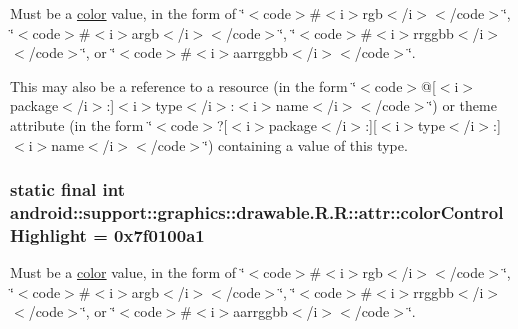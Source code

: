 Must be a \hyperlink{classandroid_1_1support_1_1graphics_1_1drawable_1_1_r_1_1color}{color} value, in the form of \char`\"{}$<$code$>$\#$<$i$>$rgb$<$/i$>$$<$/code$>$\char`\"{}, \char`\"{}$<$code$>$\#$<$i$>$argb$<$/i$>$$<$/code$>$\char`\"{}, \char`\"{}$<$code$>$\#$<$i$>$rrggbb$<$/i$>$$<$/code$>$\char`\"{}, or \char`\"{}$<$code$>$\#$<$i$>$aarrggbb$<$/i$>$$<$/code$>$\char`\"{}. 

This may also be a reference to a resource (in the form \char`\"{}$<$code$>$@\mbox{[}$<$i$>$package$<$/i$>$:\mbox{]}$<$i$>$type$<$/i$>$:$<$i$>$name$<$/i$>$$<$/code$>$\char`\"{}) or theme attribute (in the form \char`\"{}$<$code$>$?\mbox{[}$<$i$>$package$<$/i$>$:\mbox{]}\mbox{[}$<$i$>$type$<$/i$>$:\mbox{]}$<$i$>$name$<$/i$>$$<$/code$>$\char`\"{}) containing a value of this type. \hypertarget{classandroid_1_1support_1_1graphics_1_1drawable_1_1_r_1_1attr_0a0038f50062fb57e1c0f748a31a8e56}{
\subsubsection[{colorControlHighlight}]{\setlength{\rightskip}{0pt plus 5cm}static final int android::support::graphics::drawable.R.R::attr::colorControlHighlight = 0x7f0100a1}}
\label{classandroid_1_1support_1_1graphics_1_1drawable_1_1_r_1_1attr_0a0038f50062fb57e1c0f748a31a8e56}


Must be a \hyperlink{classandroid_1_1support_1_1graphics_1_1drawable_1_1_r_1_1color}{color} value, in the form of \char`\"{}$<$code$>$\#$<$i$>$rgb$<$/i$>$$<$/code$>$\char`\"{}, \char`\"{}$<$code$>$\#$<$i$>$argb$<$/i$>$$<$/code$>$\char`\"{}, \char`\"{}$<$code$>$\#$<$i$>$rrggbb$<$/i$>$$<$/code$>$\char`\"{}, or \char`\"{}$<$code$>$\#$<$i$>$aarrggbb$<$/i$>$$<$/code$>$\char`\"{}. 

